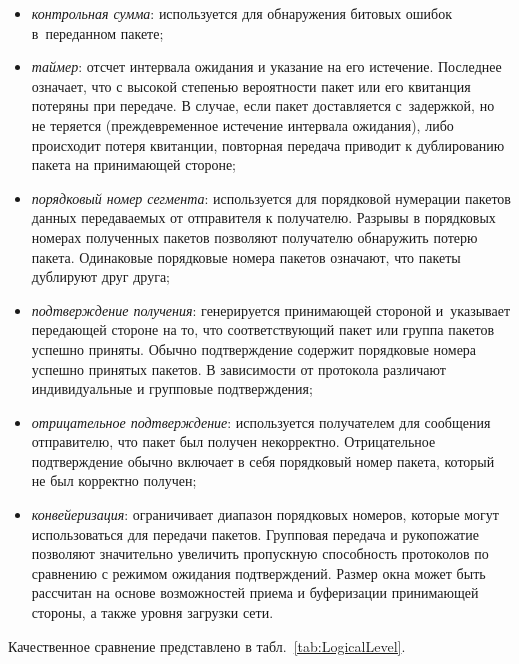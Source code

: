 \begin{itemize}[beginpenalty=10000, midpenalty=10000, wide=\parindent, leftmargin=0pt]
	\item \textit{контрольная сумма}: используется для обнаружения битовых ошибок в~переданном пакете;

	\item \textit{таймер}: отсчет интервала ожидания и указание на его истечение. Последнее означает, что с высокой степенью вероятности пакет или его квитанция потеряны при передаче. В случае, если пакет доставляется с~задержкой, но не теряется (преждевременное истечение интервала ожидания), либо происходит потеря квитанции, повторная передача приводит к дублированию пакета на принимающей стороне;

	\item \textit{порядковый номер сегмента}: используется для порядковой нумерации пакетов данных передаваемых от отправителя к получателю. Разрывы в порядковых номерах полученных пакетов позволяют получателю обнаружить потерю пакета. Одинаковые порядковые номера пакетов означают, что пакеты дублируют друг друга;

	\item \textit{подтверждение получения}: генерируется принимающей стороной и~указывает передающей стороне на то, что соответствующий пакет или группа пакетов успешно приняты. Обычно подтверждение содержит порядковые номера успешно принятых пакетов. В зависимости от протокола различают индивидуальные и групповые подтверждения;

	\item \textit{отрицательное подтверждение}: используется получателем для сообщения отправителю, что пакет был получен некорректно. Отрицательное подтверждение обычно включает в себя порядковый номер пакета, который не был корректно получен;

	\item \textit{конвейеризация}: ограничивает диапазон порядковых номеров, которые могут использоваться для передачи пакетов. Групповая передача и рукопожатие позволяют значительно увеличить пропускную способность протоколов по сравнению с режимом ожидания подтверждений. Размер окна может быть рассчитан на основе возможностей приема и буферизации принимающей стороны, а также уровня загрузки сети.
\end{itemize}

Качественное сравнение представлено в табл.\ \ref{tab:LogicalLevel}.

